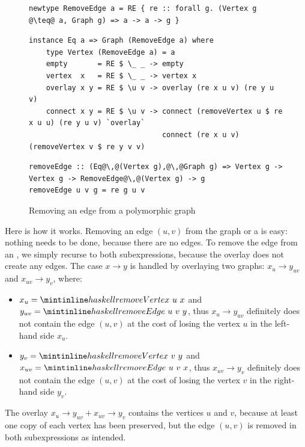 \begin{figure}
\begin{verbatim}
newtype RemoveEdge a = RE { re :: forall g. (Vertex g @\teq@ a, Graph g) => a -> a -> g }
\end{verbatim}
\vspace{1mm}
\begin{verbatim}
instance Eq a => Graph (RemoveEdge a) where
    type Vertex (RemoveEdge a) = a
    empty       = RE $ \_ _ -> empty
    vertex  x   = RE $ \_ _ -> vertex x
    overlay x y = RE $ \u v -> overlay (re x u v) (re y u v)
    connect x y = RE $ \u v -> connect (removeVertex u $ re x u u) (re y u v) `overlay`
                               connect (re x u v) (removeVertex v $ re y v v)
\end{verbatim}
\vspace{0mm}
\begin{verbatim}
removeEdge :: (Eq@\,@(Vertex g),@\,@Graph g) => Vertex g -> Vertex g -> RemoveEdge@\,@(Vertex g) -> g
removeEdge u v g = re g u v
\end{verbatim}
\caption{Removing an edge from a polymorphic graph}
\end{figure}

\noindent
Here is how it works. Removing an edge $(u,v)$ from the  graph
or a  is easy:
nothing needs to be done, because there are no edges. To remove the edge from an
, we simply recurse to both subexpressions, because the overlay does not create
any edges. The  case $x \rightarrow y$ is handled by overlaying two graphs:
$x_u \rightarrow y_{uv}$ and $x_{uv} \rightarrow y_v$, where:

\begin{itemize}
    \item $x_u = \hs{removeVertex}~u~x$ and $y_{uv} = \hs{removeEdge}~u~v~y$,
    thus $x_u \rightarrow y_{uv}$ definitely does not contain the edge $(u,v)$
    at the cost of losing the vertex $u$ in the left-hand side $x_u$.
    \item $y_v = \hs{removeVertex}~v~y$ and $x_{uv} = \hs{removeEdge}~u~v~x$,
    thus $x_{uv} \rightarrow y_v$ definitely does not contain the edge $(u,v)$
    at the cost of losing the vertex $v$ in the right-hand side $y_v$.
\end{itemize}
\noindent
The overlay $x_u \rightarrow y_{uv} + x_{uv} \rightarrow y_v$ contains the
vertices $u$ and $v$, because at least one copy of each vertex has been preserved,
but the edge $(u,v)$ is removed in both subexpressions as intended.

